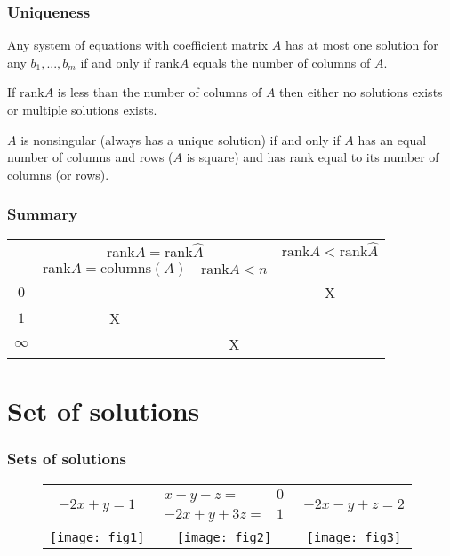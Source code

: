 \documentclass[compress]{beamer}
\newcommand{\rank}{\mathrm{rank}}
\begin{document}
\begin{frame}\frametitle{Uniqueness}
  \begin{theorem} \label{thm:sunique}
    Any system of equations with coefficient matrix $A$ has at most one
    solution for any $b_1, ... , b_m$ if and only if $\rank A$ equals
    the number of columns of $A$. 
  \end{theorem}

  \begin{corollary}\label{cor:smult}
    If $\rank A$ is less than the number of columns of $A$ then either
    no solutions exists or multiple solutions exists.
  \end{corollary}
  
  \begin{corollary}
    $A$ is nonsingular (always has a unique solution) if and only if
    $A$ has an equal number of columns and rows ($A$ is square) and
    has rank equal to its number of columns (or rows).
  \end{corollary}
\end{frame}

\begin{frame}
  \frametitle{Summary}
  \begin{centering}
  \begin{tabular}{c|c|c|c} 
    & \multicolumn{2}{c}{$\rank A = \rank \hat{A}$} &  
    $\rank A < \rank \hat{A} $ \\ 
    & $\rank A = \mathrm{columns}(A)$ & 
    $\rank A < n$ & \\ \hline
    $0$ &  &  & X \\
    $1$ & X & & \\
    $\infty$ & & X & \\ \hline
  \end{tabular}
  \end{centering}
\end{frame}

\section{Set of solutions}

\begin{frame}
  \frametitle{Sets of solutions}
\begin{figure}\label{fig:solnSets}
  \begin{tabular}{ccc}
    $-2x + y = 1$
    &
    $\begin{array}{cc} 
      x - y - z = & 0 \\
      -2x + y + 3z = & 1 
    \end{array}$    
    & 
    $
    -2x - y +  z =  2
    $
    \\
    \texttt{[image: fig1]} & 
    \texttt{[image: fig2]} & 
    \texttt{[image: fig3]} 
  \end{tabular}
\end{figure}
\end{frame}
\end{document}

